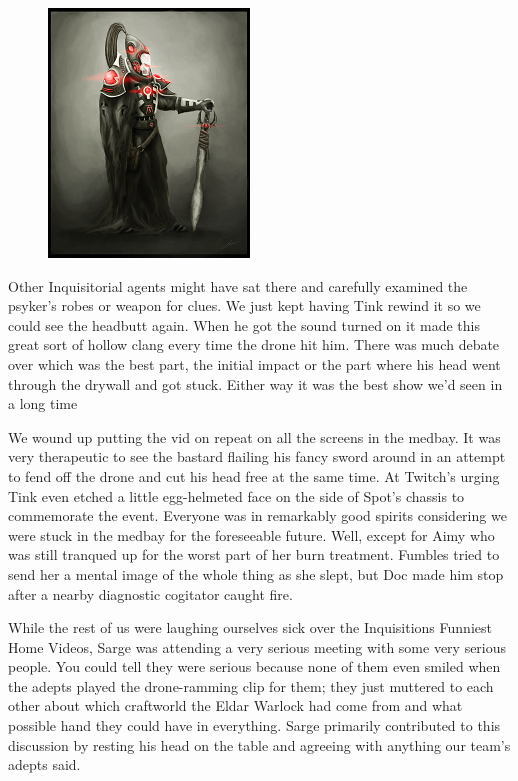 \begin{figure}
	\begin{center}
		\includegraphics[width=\figwidth]{pics/11/32.png}
	\end{center}
\end{figure}
Other Inquisitorial agents might have sat there and carefully examined the psyker's robes or weapon for clues. 
We just kept having Tink rewind it so we could see the headbutt again. 
When he got the sound turned on it made this great sort of hollow clang every time the drone hit him. 
There was much debate over which was the best part, the initial impact or the part where his head went through the drywall and got stuck. 
Either way it was the best show we'd seen in a long time

We wound up putting the vid on repeat on all the screens in the medbay. 
It was very therapeutic to see the bastard flailing his fancy sword around in an attempt to fend off the drone and cut his head free at the same time. 
At Twitch's urging Tink even etched a little egg-helmeted face on the side of Spot's chassis to commemorate the event. 
Everyone was in remarkably good spirits considering we were stuck in the medbay for the foreseeable future. 
Well, except for Aimy who was still tranqued up for the worst part of her burn treatment. 
Fumbles tried to send her a mental image of the whole thing as she slept, but Doc made him stop after a nearby diagnostic cogitator caught fire.

While the rest of us were laughing ourselves sick over the Inquisitions Funniest Home Videos, Sarge was attending a very serious meeting with some very serious people. 
You could tell they were serious because none of them even smiled when the adepts played the drone-ramming clip for them; 
they just muttered to each other about which craftworld the Eldar Warlock had come from and what possible hand they could have in everything. 
Sarge primarily contributed to this discussion by resting his head on the table and agreeing with anything our team's adepts said.

